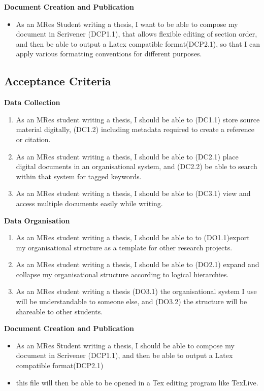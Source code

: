 \documentclass{article}
\begin{document}
\noindent \textbf{Document Creation and Publication}
\begin{itemize}
    \item As an MRes Student writing a thesis, I want to be able to compose my document in Scrivener (DCP1.1), that allows flexible editing of section order, and then be able to output a Latex compatible format(DCP2.1), so that I can apply various formatting conventions for different purposes.
\end{itemize}

\subsection{Acceptance Criteria}
\textbf{Data Collection}
\begin{enumerate}
    \item As an MRes student writing a thesis, I should be able to (DC1.1) store source material digitally, (DC1.2) including metadata required to create a reference or citation.
    \item As an  MRes student writing a thesis, I should be able to (DC2.1) place digital documents in an organisational system, and (DC2.2) be able to search within that system for tagged keywords. 
    \item As an MRes student writing a thesis, I should be able to (DC3.1) view and access multiple documents easily while writing.
\end{enumerate}
    


\noindent \textbf{Data Organisation}
\begin{enumerate}
    \item As an MRes student writing a thesis, I should be able to to (DO1.1)export my organisational structure as a template for other research projects. 
    \item As an MRes student writing a thesis, I should be able to (DO2.1) expand and collapse my organisational structure according to logical hierarchies.
    \item As an MRes student writing a thesis (DO3.1) the organisational system I use will be understandable to someone else, and (DO3.2) the structure will be shareable to other students.
\end{enumerate}


\noindent \textbf{Document Creation and Publication}
\begin{itemize}
    \item As an MRes Student writing a thesis, I should be able to compose my document in Scrivener (DCP1.1), and then be able to output a Latex compatible format(DCP2.1)
    \item this file will then be able to be opened in a Tex editing program like TexLive.
\end{itemize}
\end{document}
